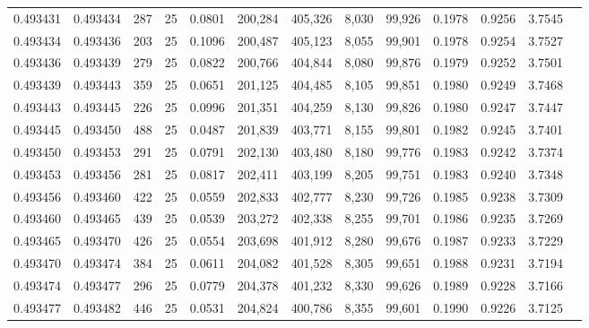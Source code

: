 \begin{tabular}{rrrrrrrrrrrrr}
0.493431 & 0.493434 &   287 &  25 &                                     0.0801 & 200,284 & 405,326 &   8,030 &  99,926 & 0.1978 & 0.9256 & 3.7545 \\
0.493434 & 0.493436 &   203 &  25 &                                     0.1096 & 200,487 & 405,123 &   8,055 &  99,901 & 0.1978 & 0.9254 & 3.7527 \\
0.493436 & 0.493439 &   279 &  25 &                                     0.0822 & 200,766 & 404,844 &   8,080 &  99,876 & 0.1979 & 0.9252 & 3.7501 \\
0.493439 & 0.493443 &   359 &  25 &                                     0.0651 & 201,125 & 404,485 &   8,105 &  99,851 & 0.1980 & 0.9249 & 3.7468 \\
0.493443 & 0.493445 &   226 &  25 &                                     0.0996 & 201,351 & 404,259 &   8,130 &  99,826 & 0.1980 & 0.9247 & 3.7447 \\
0.493445 & 0.493450 &   488 &  25 &                                     0.0487 & 201,839 & 403,771 &   8,155 &  99,801 & 0.1982 & 0.9245 & 3.7401 \\
0.493450 & 0.493453 &   291 &  25 &                                     0.0791 & 202,130 & 403,480 &   8,180 &  99,776 & 0.1983 & 0.9242 & 3.7374 \\
0.493453 & 0.493456 &   281 &  25 &                                     0.0817 & 202,411 & 403,199 &   8,205 &  99,751 & 0.1983 & 0.9240 & 3.7348 \\
0.493456 & 0.493460 &   422 &  25 &                                     0.0559 & 202,833 & 402,777 &   8,230 &  99,726 & 0.1985 & 0.9238 & 3.7309 \\
0.493460 & 0.493465 &   439 &  25 &                                     0.0539 & 203,272 & 402,338 &   8,255 &  99,701 & 0.1986 & 0.9235 & 3.7269 \\
0.493465 & 0.493470 &   426 &  25 &                                     0.0554 & 203,698 & 401,912 &   8,280 &  99,676 & 0.1987 & 0.9233 & 3.7229 \\
0.493470 & 0.493474 &   384 &  25 &                                     0.0611 & 204,082 & 401,528 &   8,305 &  99,651 & 0.1988 & 0.9231 & 3.7194 \\
0.493474 & 0.493477 &   296 &  25 &                                     0.0779 & 204,378 & 401,232 &   8,330 &  99,626 & 0.1989 & 0.9228 & 3.7166 \\
0.493477 & 0.493482 &   446 &  25 &                                     0.0531 & 204,824 & 400,786 &   8,355 &  99,601 & 0.1990 & 0.9226 & 3.7125 \\

\end{tabular}
